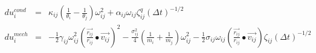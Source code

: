\documentclass[12pt]{article}
\begin{document}
\begin{eqnarray*}
  du_{i}^{cond} & = & \kappa_{ij}(\frac{1}{\theta_{i}}-\frac{1}{\theta_{j}})\omega_{ij}^{2} + \alpha_{ij}\omega_{ij}\zeta_{ij}^{q}(\Delta{t})^{-1/2} \\
  du_{i}^{mech} & = & -\frac{1}{2}\gamma_{ij}\omega_{ij}^{2}(\frac{\vec{r_{ij}}}{r_{ij}}\bullet\vec{v_{ij}})^{2} - 
  \frac{\sigma^{2}_{ij}}{4}(\frac{1}{m_{i}}+\frac{1}{m_{j}})\omega_{ij}^{2} - 
  \frac{1}{2}\sigma_{ij}\omega_{ij}(\frac{\vec{r_{ij}}}{r_{ij}}\bullet\vec{v_{ij}})\zeta_{ij}(\Delta{t})^{-1/2} \\
\end{eqnarray*}                           
\end{document}
